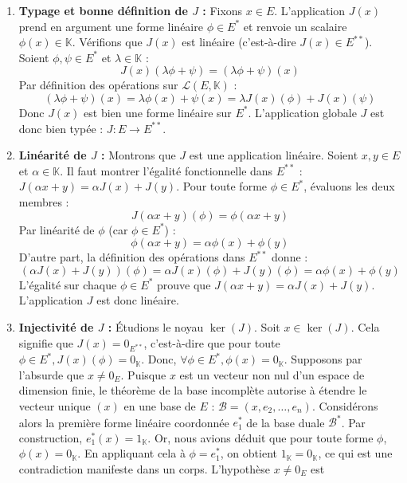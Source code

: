 \begin{enumerate}
\def\labelenumi{\arabic{enumi}.}
\item
  \textbf{Typage et bonne définition de \(J\) :} Fixons \(x \in E\).
  L'application \(J(x)\) prend en argument une forme linéaire
  \(\phi \in E^*\) et renvoie un scalaire \(\phi(x) \in \mathbb{K}\).
  Vérifions que \(J(x)\) est linéaire (c'est-à-dire
  \(J(x) \in E^{**}\)). Soient \(\phi, \psi \in E^*\) et
  \(\lambda \in \mathbb{K}\) :
  \[ J(x)(\lambda \phi + \psi) = (\lambda \phi + \psi)(x) \] Par
  définition des opérations sur \(\mathcal{L}(E, \mathbb{K})\) :
  \[ (\lambda \phi + \psi)(x) = \lambda \phi(x) + \psi(x) = \lambda J(x)(\phi) + J(x)(\psi) \]
  Donc \(J(x)\) est bien une forme linéaire sur \(E^*\). L'application
  globale \(J\) est donc bien typée : \(J : E \to E^{**}\).
\item
  \textbf{Linéarité de \(J\) :} Montrons que \(J\) est une application
  linéaire. Soient \(x, y \in E\) et \(\alpha \in \mathbb{K}\). Il faut
  montrer l'égalité fonctionnelle dans \(E^{**}\) :
  \(J(\alpha x + y) = \alpha J(x) + J(y)\). Pour toute forme
  \(\phi \in E^*\), évaluons les deux membres :
  \[ J(\alpha x + y)(\phi) = \phi(\alpha x + y) \] Par linéarité de
  \(\phi\) (car \(\phi \in E^*\)) :
  \[ \phi(\alpha x + y) = \alpha \phi(x) + \phi(y) \] D'autre part, la
  définition des opérations dans \(E^{**}\) donne :
  \[ (\alpha J(x) + J(y))(\phi) = \alpha J(x)(\phi) + J(y)(\phi) = \alpha \phi(x) + \phi(y) \]
  L'égalité sur chaque \(\phi \in E^*\) prouve que
  \(J(\alpha x + y) = \alpha J(x) + J(y)\). L'application \(J\) est donc
  linéaire.
\item
  \textbf{Injectivité de \(J\) :} Étudions le noyau \(\ker(J)\). Soit
  \(x \in \ker(J)\). Cela signifie que \(J(x) = 0_{E^{**}}\),
  c'est-à-dire que pour toute
  \(\phi \in E^*, J(x)(\phi) = 0_{\mathbb{K}}\). Donc,
  \(\forall \phi \in E^*, \phi(x) = 0_{\mathbb{K}}\). Supposons par
  l'absurde que \(x \neq 0_E\). Puisque \(x\) est un vecteur non nul
  d'un espace de dimension finie, le théorème de la base incomplète
  autorise à étendre le vecteur unique \((x)\) en une base de \(E\) :
  \(\mathcal{B} = (x, e_2, \dots, e_n)\). Considérons alors la première
  forme linéaire coordonnée \(e_1^*\) de la base duale
  \(\mathcal{B}^*\). Par construction, \(e_1^*(x) = 1_{\mathbb{K}}\).
  Or, nous avions déduit que pour toute forme \(\phi\),
  \(\phi(x) = 0_{\mathbb{K}}\). En appliquant cela à \(\phi = e_1^*\),
  on obtient \(1_{\mathbb{K}} = 0_{\mathbb{K}}\), ce qui est une
  contradiction manifeste dans un corps. L'hypothèse \(x \neq 0_E\) est

\end{enumerate}
